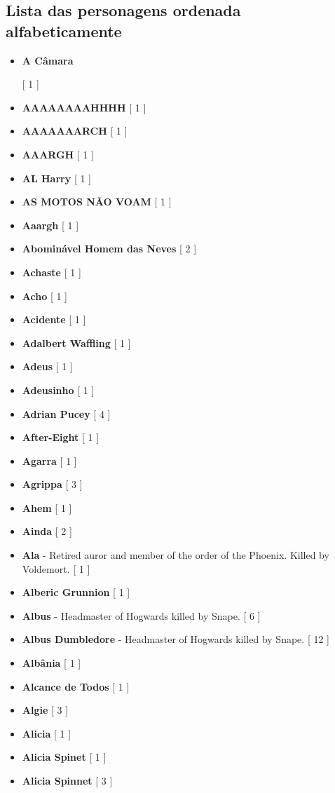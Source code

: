 \documentclass[a4paper]{article}
\begin{document}
{\subsection{Lista das personagens ordenada alfabeticamente}
\begin{itemize}
	\item \hypertarget{A}{\textbf{A Câmara}} [ 1 ]
	\item \textbf{AAAAAAAAHHHH} [ 1 ]
	\item \textbf{AAAAAAARCH} [ 1 ]
	\item \textbf{AAARGH} [ 1 ]
	\item \textbf{AL Harry} [ 1 ]
	\item \textbf{AS MOTOS NÃO VOAM} [ 1 ]
	\item \textbf{Aaargh} [ 1 ]
	\item \textbf{Abominável Homem das Neves} [ 2 ]
	\item \textbf{Achaste} [ 1 ]
	\item \textbf{Acho} [ 1 ]
	\item \textbf{Acidente} [ 1 ]
	\item \textbf{Adalbert Waffling} [ 1 ]
	\item \textbf{Adeus} [ 1 ]
	\item \textbf{Adeusinho} [ 1 ]
	\item \textbf{Adrian Pucey} [ 4 ]
	\item \textbf{After-Eight} [ 1 ]
	\item \textbf{Agarra} [ 1 ]
	\item \textbf{Agrippa} [ 3 ]
	\item \textbf{Ahem} [ 1 ]
	\item \textbf{Ainda} [ 2 ]
	\item \textbf{Ala} - Retired auror and member of the order of the Phoenix. Killed by Voldemort. [ 1 ]
	\item \textbf{Alberic Grunnion} [ 1 ]
	\item \textbf{Albus} - Headmaster of Hogwards killed by Snape. [ 6 ]
	\item \textbf{Albus Dumbledore} - Headmaster of Hogwards killed by Snape. [ 12 ]
	\item \textbf{Albânia} [ 1 ]
	\item \textbf{Alcance de Todos} [ 1 ]
	\item \textbf{Algie} [ 3 ]
	\item \textbf{Alicia} [ 1 ]
	\item \textbf{Alicia Spinet} [ 1 ]
	\item \textbf{Alicia Spinnet} [ 3 ]

\end{itemize}}
\end{document}
